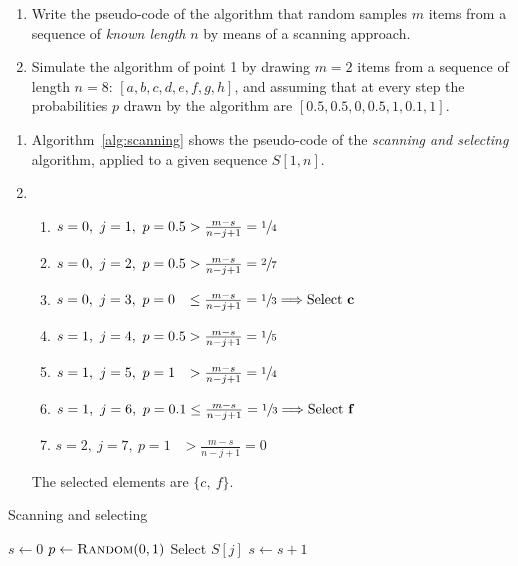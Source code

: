 \exercise

\begin{enumerate}
  \item Write the pseudo-code of the algorithm that random samples $m$ items
  from a sequence of \emph{known length} $n$ by means of a scanning approach.
  \item Simulate the algorithm of point 1 by drawing $m = 2$ items from a
  sequence of length $n = 8$: $[a, b, c, d, e, f, g, h]$, and assuming that at
  every step the probabilities $p$ drawn by the algorithm are $[0.5, 0.5, 0,
  0.5, 1, 0.1, 1]$.
\end{enumerate}

\solution

\begin{enumerate}

  \item Algorithm~\ref{alg:scanning} shows the pseudo-code of the \emph{scanning
  and selecting} algorithm, applied to a given sequence $S[1, n]$.

  \item \begin{enumerate}[\bf a.]
    \item $s = 0,\ j = 1,\ p = 0.5 > \frac{m-s}{n-j+1} = \sfrac{1}{4}$
    \item $s = 0,\ j = 2,\ p = 0.5 > \frac{m-s}{n-j+1} = \sfrac{2}{7}$
    \item $s = 0,\ j = 3,\ p = 0\phantom{.5} \le \frac{m-s}{n-j+1} = \sfrac{1}{3} \Longrightarrow \text{Select \bf c}$
    \item $s = 1,\ j = 4,\ p = 0.5 > \frac{m-s}{n-j+1} = \sfrac{1}{5}$
    \item $s = 1,\ j = 5,\ p = 1\phantom{.5} > \frac{m-s}{n-j+1} = \sfrac{1}{4}$
    \item $s = 1,\ j = 6,\ p = 0.1 \le \frac{m-s}{n-j+1} = \sfrac{1}{3} \Longrightarrow \text{Select \bf f}$
    \item $s = 2,\ j = 7,\ p = 1\phantom{.5} > \frac{m-s}{n-j+1} = 0$
  \end{enumerate}
  The selected elements are $\{ c,\ f \}$.

\end{enumerate}
%
\begin{algorithm}[h]
\caption{Scanning and selecting}\label{alg:scanning}
\begin{algorithmic}[1]
\State $s \gets 0$
  \State $p \gets \text{\sc Random}(0, 1)$
  \State Select $S[j]$
  \State $s \gets s + 1$
  \EndIf
\EndFor
\end{algorithmic}
\end{algorithm}
